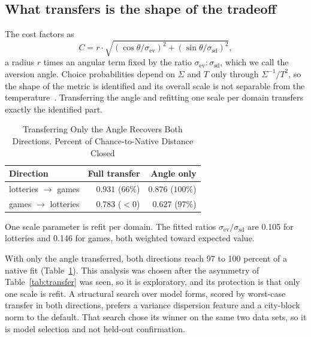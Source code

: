 \documentclass[journal]{IEEEtran}
\begin{document}
\subsection{What transfers is the shape of the tradeoff}
The cost factors as
\begin{equation}
    C = r\cdot\sqrt{(\cos\theta/\sigma_{\mathrm{ev}})^2 + (\sin\theta/\sigma_{\mathrm{sd}})^2},
    \label{eq:polar}
\end{equation}
a radius $r$ times an angular term fixed by the ratio $\sigma_{\mathrm{ev}}\!:\!\sigma_{\mathrm{sd}}$, which we call the aversion angle.
Choice probabilities depend on $\Sigma$ and $T$ only through $\Sigma^{-1}/T^2$, so the shape of the metric is identified and its overall scale is not separable from the temperature~\cite{bond2026theory}.
Transferring the angle and refitting one scale per domain transfers exactly the identified part.

\begin{table}[!t]
\renewcommand{\arraystretch}{1.15}
\caption{Transferring Only the Angle Recovers Both Directions. Percent of Chance-to-Native Distance Closed}
\label{tab:polar}
\centering
\begin{tabular}{l r r}
\toprule
\textbf{Direction} & \textbf{Full transfer} & \textbf{Angle only} \\
\midrule
lotteries $\to$ games & $0.931$ \; ($66\%$) & $0.876$ \; ($100\%$) \\
games $\to$ lotteries & $0.783$ \; ($<0$)   & $0.627$ \; ($97\%$) \\
\bottomrule
\end{tabular}
\begin{flushleft}
\footnotesize{One scale parameter is refit per domain. The fitted ratios $\sigma_{\mathrm{ev}}/\sigma_{\mathrm{sd}}$ are 0.105 for lotteries and 0.146 for games, both weighted toward expected value.}
\end{flushleft}
\end{table}

With only the angle transferred, both directions reach 97 to 100 percent of a native fit (Table~\ref{tab:polar}).
This analysis was chosen after the asymmetry of Table~\ref{tab:transfer} was seen, so it is exploratory, and its protection is that only one scale is refit.
A structural search over model forms, scored by worst-case transfer in both directions, prefers a variance dispersion feature and a city-block norm to the default.
That search chose its winner on the same two data sets, so it is model selection and not held-out confirmation.
\end{document}
